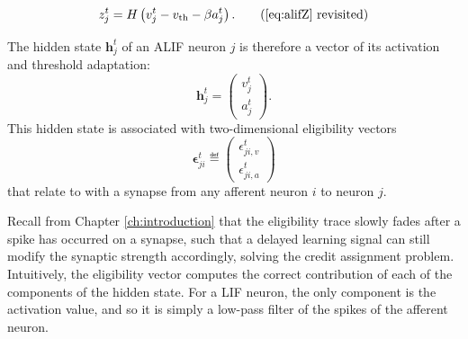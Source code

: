             \begin{equation*}
            z^t_j = H\left(v_j^t - v_\text{th} - \beta a^t_j\right). \tag{\ref{eq:alifZ} revisited}
            \end{equation*}

            The hidden state $\mathbf{h}^t_j$ of an ALIF neuron $j$ is therefore a vector of its activation and threshold adaptation:
            \begin{equation}
            \mathbf{h}^t_j = \begin{pmatrix}
            v^t_j\\
            a^t_j
            \end{pmatrix}.
            \end{equation}
            This hidden state is associated with two-dimensional eligibility vectors
            \begin{equation}
            \bm{\epsilon}^t_{ji} \eqdef \begin{pmatrix}
            \epsilon_{ji, v}^t\\
            \epsilon_{ji, a}^t
            \end{pmatrix}
            \end{equation}
            that relate to with a synapse from any afferent neuron $i$ to neuron $j$.

            Recall from Chapter \ref{ch:introduction} that the eligibility trace slowly fades after a spike has occurred on a synapse, such that a delayed learning signal can still modify the synaptic strength accordingly, solving the credit assignment problem.
            Intuitively, the eligibility vector computes the correct contribution of each of the components of the hidden state.
            For a LIF neuron, the only component is the activation value, and so it is simply a low-pass filter of the spikes of the afferent neuron.

